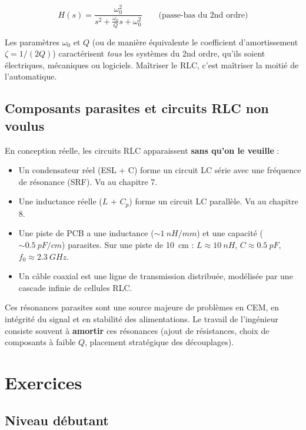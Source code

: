 \documentclass[12pt,a4paper,twoside]{book}
\begin{document}
\begin{formule}
\[
\boxed{H(s) = \frac{\omega_0^2}{s^2 + \frac{\omega_0}{Q}s + \omega_0^2}} \qquad \text{(passe-bas du 2nd ordre)}
\]
\end{formule}

Les paramètres $\omega_0$ et $Q$ (ou de manière équivalente le coefficient d'amortissement $\zeta = 1/(2Q)$) caractérisent \textit{tous} les systèmes du 2nd ordre, qu'ils soient électriques, mécaniques ou logiciels. Maîtriser le RLC, c'est maîtriser la moitié de l'automatique.

\subsection{Composants parasites et circuits RLC non voulus}

\begin{attention}
En conception réelle, les circuits RLC apparaissent \textbf{sans qu'on le veuille} :
\begin{itemize}[nosep]
\item Un condensateur réel (ESL + C) forme un circuit LC série avec une fréquence de résonance (SRF). Vu au chapitre 7.
\item Une inductance réelle ($L$ + $C_p$) forme un circuit LC parallèle. Vu au chapitre 8.
\item Une piste de PCB a une inductance ($\sim\SI{1}{nH/mm}$) et une capacité ($\sim\SI{0.5}{pF/cm}$) parasites. Sur une piste de \SI{10}{cm} : $L \approx \SI{10}{nH}$, $C \approx \SI{0.5}{pF}$, $f_0 \approx \SI{2.3}{GHz}$.
\item Un câble coaxial est une ligne de transmission distribuée, modélisée par une cascade infinie de cellules RLC.
\end{itemize}
Ces résonances parasites sont une source majeure de problèmes en CEM, en intégrité du signal et en stabilité des alimentations. Le travail de l'ingénieur consiste souvent à \textbf{amortir} ces résonances (ajout de résistances, choix de composants à faible $Q$, placement stratégique des découplages).
\end{attention}

\section*{Exercices}

\subsection*{Niveau débutant}
\end{document}
